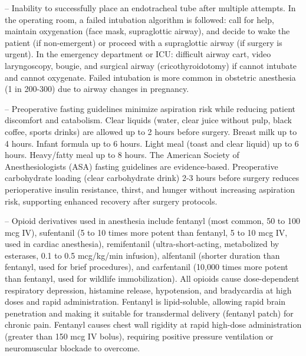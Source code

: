 -- Inability to successfully place an endotracheal tube after multiple attempts. In the operating room, a failed intubation algorithm is followed: call for help, maintain oxygenation (face mask, supraglottic airway), and decide to wake the patient (if non-emergent) or proceed with a supraglottic airway (if surgery is urgent). In the emergency department or ICU: difficult airway cart, video laryngoscopy, bougie, and surgical airway (cricothyroidotomy) if cannot intubate and cannot oxygenate. Failed intubation is more common in obstetric anesthesia (1 in 200-300) due to airway changes in pregnancy.

-- Preoperative fasting guidelines minimize aspiration risk while reducing patient discomfort and catabolism. Clear liquids (water, clear juice without pulp, black coffee, sports drinks) are allowed up to 2 hours before surgery. Breast milk up to 4 hours. Infant formula up to 6 hours. Light meal (toast and clear liquid) up to 6 hours. Heavy/fatty meal up to 8 hours. The American Society of Anesthesiologists (ASA) fasting guidelines are evidence-based. Preoperative carbohydrate loading (clear carbohydrate drink) 2-3 hours before surgery reduces perioperative insulin resistance, thirst, and hunger without increasing aspiration risk, supporting enhanced recovery after surgery protocols.

-- Opioid derivatives used in anesthesia include fentanyl (most common, 50 to 100 mcg IV), sufentanil (5 to 10 times more potent than fentanyl, 5 to 10 mcg IV, used in cardiac anesthesia), remifentanil (ultra-short-acting, metabolized by esterases, 0.1 to 0.5 mcg/kg/min infusion), alfentanil (shorter duration than fentanyl, used for brief procedures), and carfentanil (10,000 times more potent than fentanyl, used for wildlife immobilization). All opioids cause dose-dependent respiratory depression, histamine release, hypotension, and bradycardia at high doses and rapid administration. Fentanyl is lipid-soluble, allowing rapid brain penetration and making it suitable for transdermal delivery (fentanyl patch) for chronic pain. Fentanyl causes chest wall rigidity at rapid high-dose administration (greater than 150 mcg IV bolus), requiring positive pressure ventilation or neuromuscular blockade to overcome.

